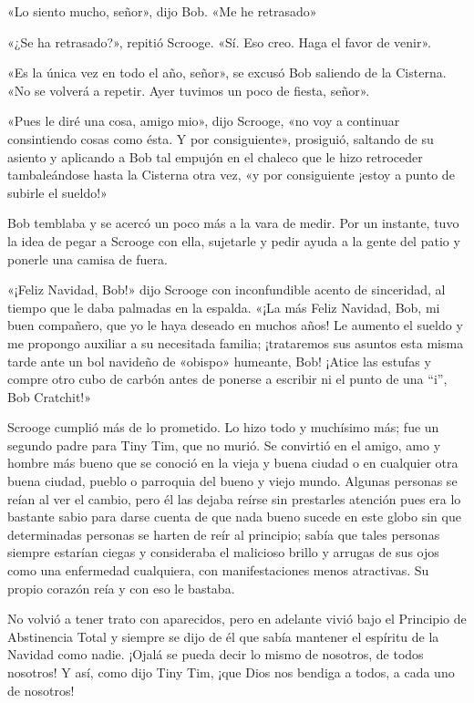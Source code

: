 \documentclass{novela}
\begin{document}
 «Lo siento mucho, señor», dijo Bob. «Me he retrasado»
 
 «¿Se ha retrasado?», repitió Scrooge. «Sí. Eso creo. Haga el favor de venir».

 «Es la única vez en todo el año, señor», se excusó Bob saliendo de la Cisterna. «No se volverá a repetir. Ayer tuvimos un poco de fiesta, señor».

 «Pues le diré una cosa, amigo mio», dijo Scrooge, «no voy a continuar consintiendo cosas como ésta. Y por consiguiente», prosiguió, saltando de su asiento y aplicando a Bob tal empujón en el chaleco que le hizo retroceder tambaleándose hasta la Cisterna otra vez, «y por consiguiente ¡estoy a punto de subirle el sueldo!»

 Bob temblaba y se acercó un poco más a la vara de medir. Por un instante, tuvo la idea de pegar a Scrooge con ella, sujetarle y pedir ayuda a la gente del patio y ponerle una camisa de fuera.

 «¡Feliz Navidad, Bob!» dijo Scrooge con inconfundible acento de sinceridad, al tiempo que le daba palmadas en la espalda. «¡La más Feliz Navidad, Bob, mi buen compañero, que yo le haya deseado en muchos años! Le aumento el sueldo y me propongo auxiliar a su necesitada familia; ¡trataremos sus asuntos esta misma tarde ante un bol navideño de «obispo» humeante, Bob! ¡Atice las estufas y compre otro cubo de carbón antes de ponerse a escribir ni el punto de una “i”, Bob Cratchit!»

 Scrooge cumplió más de lo prometido. Lo hizo todo y muchísimo más; fue un segundo padre para Tiny Tim, que no murió. Se convirtió en el amigo, amo y hombre más bueno que se conoció en la vieja y buena ciudad o en cualquier otra buena ciudad, pueblo o parroquia del bueno y viejo mundo. Algunas personas se reían al ver el cambio, pero él las dejaba reírse sin prestarles atención pues era lo bastante sabio para darse cuenta de que nada bueno sucede en este globo sin que determinadas personas se harten de reír al principio; sabía que tales personas siempre estarían ciegas y consideraba el malicioso brillo y arrugas de sus ojos como una enfermedad cualquiera, con manifestaciones menos atractivas. Su propio corazón reía y con eso le bastaba.

 No volvió a tener trato con aparecidos, pero en adelante vivió bajo el Principio de Abstinencia Total y siempre se dijo de él que sabía mantener el espíritu de la Navidad como nadie. ¡Ojalá se pueda decir lo mismo de nosotros, de todos nosotros! Y así, como dijo Tiny Tim, ¡que Dios nos bendiga a todos, a cada uno de nosotros!




 \Fin%
\end{document}
